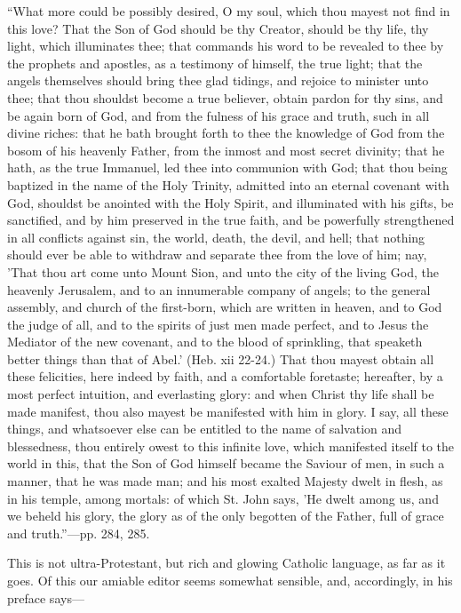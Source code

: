 ``What more could be possibly
desired, O my soul, which thou mayest not find in this love? That the
Son of God should be thy Creator, should be thy life, thy light, which
illuminates thee; that commands his word to be revealed to thee by the
prophets and apostles, as a testimony of himself, the true light; that
the angels themselves should bring thee glad tidings, and rejoice to
minister unto thee; that thou shouldst become a true believer, obtain
pardon for thy sins, and be again born of God, and from the fulness of
his grace and truth, such in all divine riches: that he bath brought
forth to thee the knowledge of God from the bosom of his heavenly
Father, from the inmost and most secret divinity; that he hath, as the
true Immanuel, led thee into communion with God; that thou being
baptized in the name of the Holy Trinity, admitted into an eternal
covenant with God, shouldst be anointed with the Holy Spirit, and
illuminated with his gifts, be sanctified, and by him preserved in the
true faith, and be powerfully strengthened in all conflicts against sin,
the world, death, the devil, and hell; that nothing should ever be able
to withdraw and separate thee from the love of him; nay, 'That thou art
come unto Mount Sion, and unto the city of the living God, the heavenly
Jerusalem, and to an innumerable company of angels; to the general
assembly, and church of the first-born, which are written in heaven, and
to God the judge of all, and to the spirits of just men made perfect,
and to Jesus the Mediator of the new covenant, and to the blood of
sprinkling, that speaketh better things than that of Abel.' (Heb. xii
22-24.) That thou mayest obtain all these felicities, here indeed by
faith, and a comfortable foretaste; hereafter, by a most perfect
intuition, and everlasting glory: and when Christ thy life shall be made
manifest, thou also mayest be manifested with him in glory. I say, all
these things, and whatsoever else can be entitled to the name of
salvation and blessedness, thou entirely owest to this infinite love,
which manifested itself to the world in this, that the Son of God
himself became the Saviour of men, in such a manner, that he was made
man; and his most exalted Majesty dwelt in flesh, as in his temple,
among mortals: of which St. John says, 'He
dwelt among us, and we beheld his glory, the glory as of the only
begotten of the Father, full of grace and truth.''—pp. 284, 285.

This is not ultra-Protestant, but rich and glowing
Catholic language, as far as it goes. Of this our amiable editor seems
somewhat sensible, and, accordingly, in his preface says—

